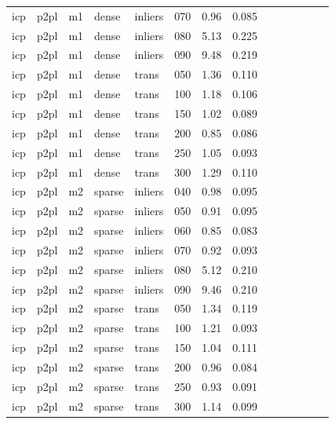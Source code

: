 \begin{table}[htbp]
\begin{tabular}{llllllrrrrrrrr}
  icp & p2pl & m1 & dense & inliers & 070 & 0.96 & 0.085 \\
  icp & p2pl & m1 & dense & inliers & 080 & 5.13 & 0.225 \\
  icp & p2pl & m1 & dense & inliers & 090 & 9.48 & 0.219 \\
  icp & p2pl & m1 & dense & trans & 050 & 1.36 & 0.110 \\
  icp & p2pl & m1 & dense & trans & 100 & 1.18 & 0.106 \\
  icp & p2pl & m1 & dense & trans & 150 & 1.02 & 0.089 \\
  icp & p2pl & m1 & dense & trans & 200 & 0.85 & 0.086 \\
  icp & p2pl & m1 & dense & trans & 250 & 1.05 & 0.093 \\
  icp & p2pl & m1 & dense & trans & 300 & 1.29 & 0.110 \\
  icp & p2pl & m2 & sparse & inliers & 040 & 0.98 & 0.095 \\
  icp & p2pl & m2 & sparse & inliers & 050 & 0.91 & 0.095 \\
  icp & p2pl & m2 & sparse & inliers & 060 & 0.85 & 0.083 \\
  icp & p2pl & m2 & sparse & inliers & 070 & 0.92 & 0.093 \\
  icp & p2pl & m2 & sparse & inliers & 080 & 5.12 & 0.210 \\
  icp & p2pl & m2 & sparse & inliers & 090 & 9.46 & 0.210 \\
  icp & p2pl & m2 & sparse & trans & 050 & 1.34 & 0.119 \\
  icp & p2pl & m2 & sparse & trans & 100 & 1.21 & 0.093 \\
  icp & p2pl & m2 & sparse & trans & 150 & 1.04 & 0.111 \\
  icp & p2pl & m2 & sparse & trans & 200 & 0.96 & 0.084 \\
  icp & p2pl & m2 & sparse & trans & 250 & 0.93 & 0.091 \\
  icp & p2pl & m2 & sparse & trans & 300 & 1.14 & 0.099 \\
\bottomrule
\end{tabular}
\end{table}

